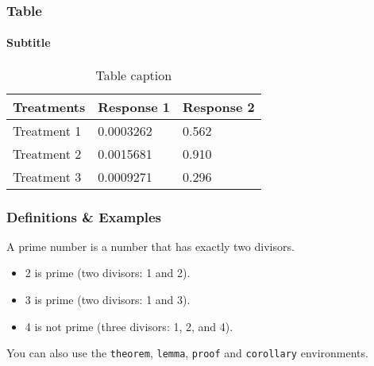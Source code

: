 \documentclass[
	11pt, %
]{beamer}
\begin{document}



\begin{frame}
    \frametitle{Table}
    \framesubtitle{Subtitle} %

    \begin{table}
        \begin{tabular}{l l l}
            \toprule
            \textbf{Treatments} & \textbf{Response 1} & \textbf{Response 2} \\
            \midrule
            Treatment 1         & 0.0003262           & 0.562               \\
            Treatment 2         & 0.0015681           & 0.910               \\
            Treatment 3         & 0.0009271           & 0.296               \\
            \bottomrule
        \end{tabular}
        \caption{Table caption}
    \end{table}
\end{frame}




\begin{frame}
    \frametitle{Definitions \& Examples}

    \begin{definition}
        A \alert{prime number} is a number that has exactly two divisors.
    \end{definition}

    \smallskip %

    \begin{example}
        \begin{itemize}
            \item 2 is prime (two divisors: 1 and 2).
            \item 3 is prime (two divisors: 1 and 3).
            \item 4 is not prime (\alert{three} divisors: 1, 2, and 4).
        \end{itemize}
    \end{example}

    \smallskip %

    You can also use the \texttt{theorem}, \texttt{lemma}, \texttt{proof} and \texttt{corollary} environments.
\end{frame}
\end{document}
